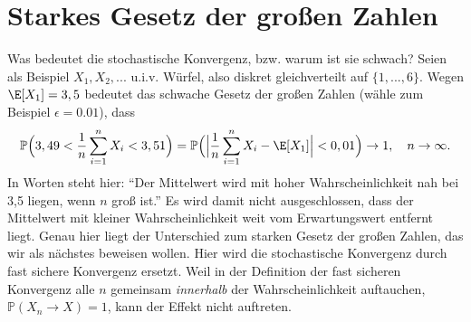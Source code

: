 

\section{Starkes Gesetz der großen Zahlen}
	Was bedeutet die stochastische Konvergenz, bzw. warum ist sie schwach? Seien als Beispiel $X_1,X_2,...$ u.i.v. Würfel, also diskret gleichverteilt auf $\{1,...,6\}$. Wegen $\E[X_1]=3,5$ bedeutet das schwache Gesetz der großen Zahlen (w\"ahle zum Beispiel $\epsilon=0.01$), dass 
	\[ \mathbb{P}\Big(3,49 < \frac{1}{n} \sum\limits_{i=1}^{n} X_i < 3,51\Big) = \mathbb{P}\Big(\Big|\frac 1 n\sum\limits_{i=1}^{n} X_i - \E[X_1]\Big| < 0,01\Big) \to 1, \quad n \to \infty. \]
	In Worten steht hier: \enquote{Der Mittelwert wird mit hoher Wahrscheinlichkeit nah bei 3,5 liegen, wenn $n$ groß ist.} Es wird damit nicht ausgeschlossen, dass der Mittelwert mit kleiner Wahrscheinlichkeit weit vom Erwartungswert entfernt liegt. Genau hier liegt der Unterschied zum starken Gesetz der gro\ss en Zahlen, das wir als n\"achstes beweisen wollen. Hier wird die stochastische Konvergenz durch fast sichere Konvergenz ersetzt. Weil in der Definition der fast sicheren Konvergenz alle $n$ gemeinsam \textit{innerhalb} der Wahrscheinlichkeit auftauchen, $\mathbb P(X_n\to X)=1$, kann der Effekt nicht auftreten.\smallskip

